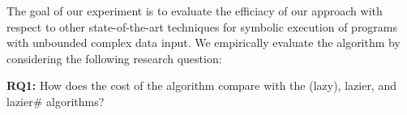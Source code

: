 
\begin{comment}
Loops and recursive methods over symbolic variables are bounded based
on some user-provided limit. These bounds are based on some
control-flow structure of the program and are often insufficient for
analyzing programs with input of complex data types as demonstrated
in~\cite{Kiasan07,Kiasan06}. In this work we use the $k$-bounding
technique that bounds the length of a reference chain from the root of
the heap~\cite{Deng:2006}.\nsr{check this!} Note we use $k$-bounding
because it preserves the functional equivalence of \gsetxt{}, lazier,
lazier\# and \symtxt{} techniques, a fact which can be established by
induction over the length of reference chains from a given initial
state. The $n$-bounding approach restricts the total number of
references created along a certain path. There is no easy way to
compare the number of references generated by \symtxt{} and other
techniques since \symtxt{} can create many references at a single
access point in its heap summary.
\end{comment}

The goal of our experiment is to evaluate the efficiacy of our approach
with respect to other state-of-the-art techniques for symbolic
execution of programs with unbounded complex data input. We empirically
evaluate the \symtxt{} algorithm by considering the following research question:

\begin{description}
\item {\bf RQ1:} How does the cost of the \symtxt{} algorithm compare with
the \gsetxt{} (lazy), lazier, and lazier\# algorithms?

\end{description}


